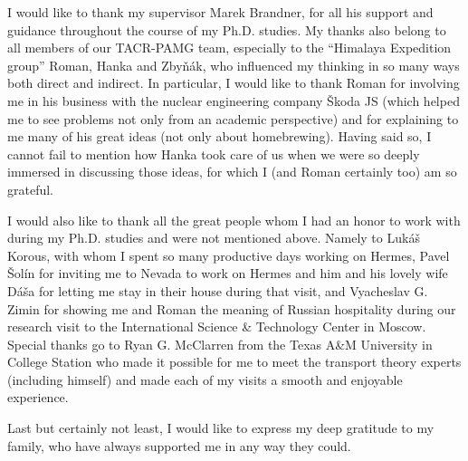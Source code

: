 

\begin{acknowledgements}      %

I would like to thank my supervisor Marek Brandner, for all his support and guidance throughout the course of 
my Ph.D. studies. My thanks also belong to all members of our TACR-PAMG team, especially to the ``Himalaya
Expedition group'' Roman, Hanka and Zby{\v n}{\' a}k, who influenced my thinking in so many ways both direct and
indirect. In particular, I would like to thank Roman for involving me in his business with the nuclear
engineering company {\v S}koda JS (which helped me to see problems not only from an academic perspective) and for
explaining to me many of his great ideas (not only about homebrewing). Having said so, I cannot fail to mention how 
Hanka took care of us when we were so deeply immersed in discussing those ideas, for which I (and Roman certainly too)
am so grateful.

I would also like to thank all the great people whom I had an honor to work with during my Ph.D. studies and were
not mentioned above. Namely to Luk{\' a}{\v s} Korous, with whom I spent so many productive days working on Hermes,
Pavel {\v S}ol{\' i}n for inviting me to Nevada to work on Hermes and him and his lovely wife D{\' a}{\v s}a for
letting me stay in their house during that visit, and Vyacheslav G. Zimin for
showing me and Roman the meaning of Russian hospitality during our research visit to the International Science \&
Technology Center in Moscow. Special thanks go to Ryan G. McClarren from the Texas A\&M University in College Station who made it
possible for me to meet the transport theory experts (including himself) and made each of my visits a smooth and
enjoyable experience.

Last but certainly not least, I would like to express my deep gratitude to my family, who have always supported me in
any way they could.

\end{acknowledgements}



